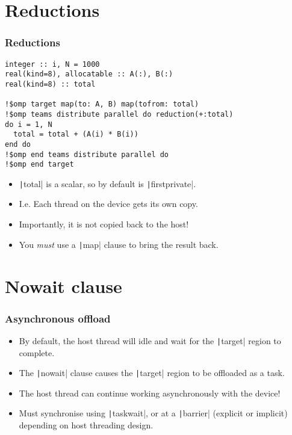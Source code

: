 \documentclass{beamer}
\begin{document}
\section{Reductions}
\begin{frame}[fragile]
\frametitle{Reductions}
\begin{verbatim}
integer :: i, N = 1000
real(kind=8), allocatable :: A(:), B(:)
real(kind=8) :: total

!$omp target map(to: A, B) map(tofrom: total)
!$omp teams distribute parallel do reduction(+:total)
do i = 1, N
  total = total + (A(i) * B(i))
end do
!$omp end teams distribute parallel do
!$omp end target
\end{verbatim}

\begin{itemize}
  \item \texttt|total| is a scalar, so by default is \texttt|firstprivate|.
  \item I.e. Each thread on the device gets its own copy.
  \item Importantly, it is not copied back to the host!
  \item You \emph{must} use a \texttt|map| clause to bring the result back.
\end{itemize}

\end{frame}

\section{Nowait clause}
\begin{frame}
\frametitle{Asynchronous offload}
\begin{itemize}
  \item By default, the host thread will idle and wait for the \texttt|target| region to complete.
  \item The \texttt|nowait| clause causes the \texttt|target| region to be offloaded as a task.
  \item The host thread can continue working asynchronously with the device!
  \item Must synchronise using \texttt|taskwait|, or at a \texttt|barrier| (explicit or implicit) depending on host threading design.
\end{itemize}
\end{frame}
\end{document}
